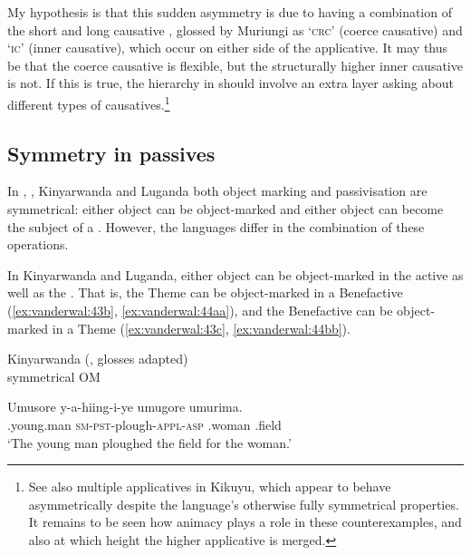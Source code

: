 \documentclass[output=paper]{LSP/langsci}
\begin{document}
\z
\z


My hypothesis is that this sudden asymmetry is due to  having a combination of the short and long causative \citep{Bastin1986}, glossed by Muriungi as ‘\textsc{crc’} (coerce causative) and ‘\textsc{ic’} (inner causative), which occur on either side of the applicative. It may thus be that the coerce causative is flexible, but the structurally higher inner causative is not. If this is true, the hierarchy in  should involve an extra layer asking about different types of causatives.\footnote{See also  multiple applicatives in Kikuyu, which appear to behave asymmetrically despite the language’s otherwise fully symmetrical properties. It remains to be seen how animacy plays a role in these counterexamples, and also at which height the higher applicative is merged.}

\subsection{Symmetry in passives}\label{sec:vdw:4.2}

In , , Kinyarwanda and Luganda both object marking and passivisation are symmetrical: either object can be object-marked and either object can become the subject of a . However, the languages differ in the combination of these operations.

In Kinyarwanda and Luganda, either object can be object-marked in the active as well as the . That is, the Theme can be object-marked in a Benefactive  (\ref{ex:vanderwal:43b}, \ref{ex:vanderwal:44aa}), and the Benefactive can be object-marked in a Theme  (\ref{ex:vanderwal:43c}, \ref{ex:vanderwal:44bb}).


\ea\label{ex:vanderwal:43}%
Kinyarwanda (\citealt[88]{Ngoboka2005}, glosses adapted)\\
{symmetrical  OM}

 \ea\label{ex:vanderwal:43a}
\gll Umusore  y-a-hiing-i-ye  umugore  umurima.\\
    .young.man  \textsc{sm-pst}{}-plough-\textsc{appl-asp}  .woman  .field\\
    \glt ‘The young man ploughed the field for the woman.’
\end{document}
